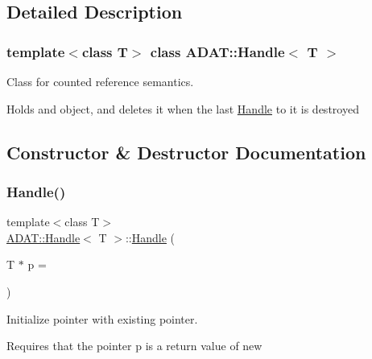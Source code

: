 \subsection{Detailed Description}
\subsubsection*{template$<$class T$>$\newline
class A\+D\+A\+T\+::\+Handle$<$ T $>$}

Class for counted reference semantics. 

Holds and object, and deletes it when the last \mbox{\hyperlink{classADAT_1_1Handle}{Handle}} to it is destroyed 

\subsection{Constructor \& Destructor Documentation}
\mbox{\label{classADAT_1_1Handle_a510e41b73c3f685f4eb78a91020782c0}} 
\subsubsection{\texorpdfstring{Handle()}{Handle()}\hspace{0.1cm}{\footnotesize\ttfamily [1/6]}}
{\footnotesize\ttfamily template$<$class T$>$ \\
\mbox{\hyperlink{classADAT_1_1Handle}{A\+D\+A\+T\+::\+Handle}}$<$ T $>$\+::\mbox{\hyperlink{classADAT_1_1Handle}{Handle}} (\begin{DoxyParamCaption}\item[{T $\ast$}]{p = {} }\end{DoxyParamCaption})\hspace{0.3cm}{\ttfamily [inline]}}



Initialize pointer with existing pointer. 

Requires that the pointer p is a return value of new \mbox{\label{classADAT_1_1Handle_af9529874ca6ca9db10dbbeeb0a776d84}} 
